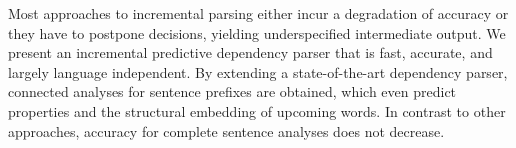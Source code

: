 Most approaches to incremental parsing either incur a degradation of accuracy or they have to postpone decisions, yielding underspecified intermediate output.  We present an incremental predictive dependency parser that is fast, accurate, and largely language independent. By extending a state-of-the-art dependency parser, connected analyses for sentence prefixes are obtained, which even predict properties and the structural embedding of upcoming words. In contrast to other approaches, accuracy for complete sentence analyses does not decrease.

